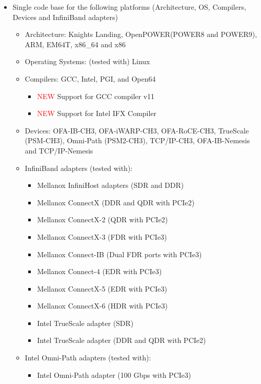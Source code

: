 \begin{itemize}
  \item  Single code base for the following platforms (Architecture, OS,
  Compilers, Devices and InfiniBand adapters)
    \begin{itemize}
      \item   Architecture: Knights Landing, OpenPOWER(POWER8 and POWER9), ARM, EM64T, x86\_64 and x86
      \item  Operating Systems: (tested with) Linux 
      \item  Compilers: GCC, Intel, PGI, and Open64
		  \begin{itemize}
		  \item \textcolor{red}{NEW} Support for GCC compiler v11
		  \item \textcolor{red}{NEW} Support for Intel IFX Compiler
		  \end{itemize}
      \item   Devices: OFA-IB-CH3, OFA-iWARP-CH3, OFA-RoCE-CH3, TrueScale (PSM-CH3), 
             Omni-Path (PSM2-CH3), TCP/IP-CH3, OFA-IB-Nemesis and TCP/IP-Nemesis 
      \item  InfiniBand adapters (tested with):
        \begin{itemize} 
          \item  Mellanox InfiniHost adapters (SDR and DDR) 
          \item  Mellanox ConnectX (DDR and QDR with PCIe2)
          \item  Mellanox ConnectX-2 (QDR with PCIe2)
          \item  Mellanox ConnectX-3 (FDR with PCIe3)
          \item  Mellanox Connect-IB (Dual FDR ports with PCIe3)
          \item  Mellanox Connect-4 (EDR with PCIe3)
          \item  Mellanox ConnectX-5 (EDR with PCIe3)
          \item  Mellanox ConnectX-6 (HDR with PCIe3)
	      \item  Intel TrueScale adapter (SDR) 
	      \item  Intel TrueScale adapter (DDR and QDR with PCIe2)
	    \end{itemize}
      \item  Intel Omni-Path adapters (tested with):
        \begin{itemize} 
	      \item  Intel Omni-Path adapter (100 Gbps with PCIe3)
	    \end{itemize}
      

\end{itemize}
\end{itemize}
